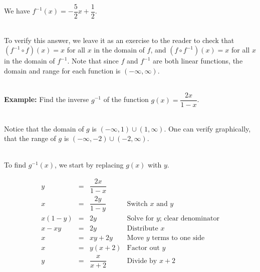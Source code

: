 \documentclass[12pt]{article}
\theoremstyle{definition}
\begin{document}
We have $f^{-1}(x) = -\dfrac{5}{2} x + \dfrac{1}{2}$.\\
\ \par
To verify this answer, we leave it as an exercise to the reader to check that $\left(f^{-1} \circ f \right)(x) = x $ for all $x$ in the domain of $f$, and $\left(f \circ f^{-1} \right)(x) = x$ for all $x$ in the domain of $f^{-1}$.  Note that since $f$ and $f^{-1}$ are both linear functions, the domain and range for each function is $(-\infty,\infty)$.\\
\ \par
{\bf Example:}  Find the inverse $g^{-1}$ of the function $g(x) = \dfrac{2x}{1-x}$.\\
\ \par
Notice that the domain of $g$ is $(-\infty,1) \cup (1, \infty)$.  One can verify graphically, that the range of $g$ is $(-\infty,-2) \cup (-2, \infty)$.\\
\ \par
To find $g^{-1}(x)$, we start by replacing $g(x)$ with $y$.

\[ \begin{array}{rcll}
y & = &  \dfrac{2x}{1-x} & \\ [7pt]
x & = & \dfrac{2y}{1-y} & \mbox{Switch $x$ and $y$} \\ [3pt]
x(1-y) & = & 2y & \mbox{Solve for $y$; clear denominator} \\ [3pt]
x-xy & = & 2y & \mbox{Distribute $x$}\\ [3pt]
x & = & xy + 2y & \mbox{Move $y$ terms to one side}\\ [3pt]
x & = & y(x+2) & \mbox{Factor out $y$}\\ [8pt]
y & = & \dfrac{x}{x+2} & \mbox{Divide by $x+2$}
\end{array} \]
\end{document}
